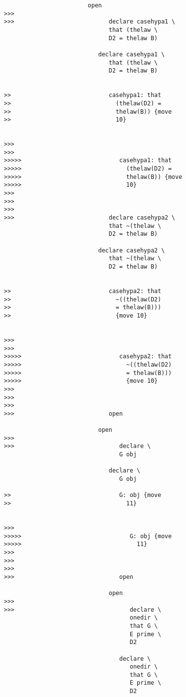 \documentclass[12pt]{article}
\begin{document}
\begin{verbatim}
                        open
>>>
>>>                           declare casehypa1 \
                              that (thelaw \
                              D2 = thelaw B)

                           declare casehypa1 \
                              that (thelaw \
                              D2 = thelaw B)


>>                            casehypa1: that
>>                              (thelaw(D2) =
>>                              thelaw(B)) {move
>>                              10}


>>>
>>>
>>>>>                            casehypa1: that
>>>>>                              (thelaw(D2) =
>>>>>                              thelaw(B)) {move
>>>>>                              10}
>>>
>>>
>>>
>>>                           declare casehypa2 \
                              that ~(thelaw \
                              D2 = thelaw B)

                           declare casehypa2 \
                              that ~(thelaw \
                              D2 = thelaw B)


>>                            casehypa2: that
>>                              ~((thelaw(D2)
>>                              = thelaw(B)))
>>                              {move 10}


>>>
>>>
>>>>>                            casehypa2: that
>>>>>                              ~((thelaw(D2)
>>>>>                              = thelaw(B)))
>>>>>                              {move 10}
>>>
>>>
>>>
>>>                           open

                           open
>>>
>>>                              declare \
                                 G obj

                              declare \
                                 G obj

>>                               G: obj {move
>>                                 11}


>>>
>>>>>                               G: obj {move
>>>>>                                 11}
>>>
>>>
>>>
>>>                              open

                              open
>>>
>>>                                 declare \
                                    onedir \
                                    that G \
                                    E prime \
                                    D2

                                 declare \
                                    onedir \
                                    that G \
                                    E prime \
                                    D2


\end{verbatim}
\end{document}
